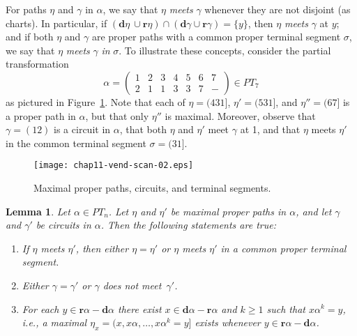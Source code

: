 \documentclass{surv-l}
\numberwithin{equation}{section}
\numberwithin{table}{section}
\numberwithin{figure}{section}
\newtheorem{lemma}[equation]{Lemma}
\theoremstyle{definition}
\begin{document}
For paths $\eta$ and $\gamma$ in $\alpha$, we say that $\eta$
\emph{meets} $\gamma$ whenever they are not disjoint (as charts).
In particular, if $(\mathbf{d}\eta\ \cup
\mathbf{r}\eta)\cap(\mathbf{d}\gamma \cup
\mathbf{r}\gamma)=\{y\}$, then $\eta$ \emph{meets} $\gamma$ at
$y$; and if both $\eta$ and $\gamma$ are proper paths with a
common proper terminal segment $\sigma$, we say that $\eta$
\emph{meets} $\gamma$ \emph{in} $\sigma$. To illustrate these
concepts, consider the partial transformation
\[
\alpha=\left(\begin{matrix}
1 & 2 & 3 & 4 & 5 & 6 & 7\\
2 & 1 & 1 & 3 & 3 & 7 & -
\end{matrix}\right)\in PT_{7}
\]
as pictured in Figure~\ref{fig11.51.1}. Note that each of
$\eta=(431]$, $\eta'=(531]$, and $\eta''=(67]$ is a proper path in
$\alpha$, but that only $\eta''$ is maximal. Moreover, observe
that $\gamma=(12)$ is a circuit in $\alpha$, that both $\eta$ and
$\eta'$ meet $\gamma$ at 1, and that $\eta$ meets $\eta'$ in the
common terminal segment $\sigma=(31]$.

\begin{figure}[!h]
\texttt{[image: chap11-vend-scan-02.eps]}
\caption{Maximal proper paths, circuits, and terminal
segments.\label{fig11.51.1}}
\end{figure}

\setcounter{equation}{1}
\begin{lemma}\label{lem11.51.2}
Let $\alpha\in PT_{n}$. Let $\eta$ and $\eta'$ be maximal proper
paths in $\alpha$, and let $\gamma$ and $\gamma'$ be circuits in
$\alpha$. Then the following statements are true:
\begin{enumerate}
\item[(1)] If $\eta$ meets $\eta'$, then either $\eta=\eta'$ or $\eta$ meets $\eta'$ in a
common proper terminal segment.

\item[(2)] Either $\gamma=\gamma'$ or $\gamma$ does not
meet~$\gamma'$.

\item[(3)] For each $y\in \mathbf{r}\alpha-\mathbf{d}\alpha$
there exist $x\in \mathbf{d}\alpha-\mathbf{r}\alpha$ and
$k\geq 1$ such that $x\alpha^{k}=y$, i.e., a maximal
$\eta_{x}=(x, x\alpha,\ldots, x\alpha^{k}=y]$ exists whenever
$y\in \mathbf{r}\alpha - \mathbf{d}\alpha$.
\end{enumerate}
\end{lemma}
\end{document}
